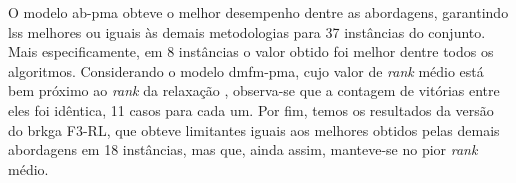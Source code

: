 O  modelo  \gls{ab-pma}  obteve  o   melhor  desempenho  dentre  as  abordagens,
garantindo  \gls{ls}s  melhores  ou  iguais   às  demais  metodologias  para  37
instâncias do conjunto. Mais especificamente, em 8 instâncias o valor obtido foi
melhor dentre  todos os algoritmos.  Considerando o modelo  \gls{dmfm-pma}, cujo
valor de {\em  rank} médio está bem  próximo ao {\em rank}  da relaxação {\rlq},
observa-se que  a contagem de  vitórias entre eles  foi idêntica, 11  casos para
cada um. Por fim, temos os resultados da versão do \gls{brkga} F3-RL, que obteve
limitantes iguais aos melhores obtidos pelas demais abordagens em 18 instâncias,
mas que, ainda assim, manteve-se no pior \textit{rank} médio.

